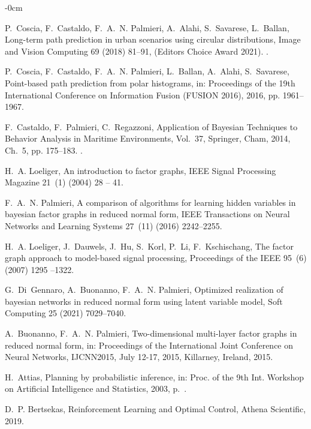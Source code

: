 \documentclass[journal,article,submit,pdftex,moreauthors]{Definitions/mdpi}
\begin{document}
\begin{adjustwidth}{-\extralength}{0cm}
\begin{thebibliography}{10}
	P.~Coscia, F.~Castaldo, F.~A.~N. Palmieri, A.~Alahi, S.~Savarese, L.~Ballan,
	  Long-term path prediction in urban scenarios using circular distributions,
	  Image and Vision Computing 69 (2018) 81--91, (Editors Choice Award 2021).
	\newblock \href {https://doi.org/doi.org/10.1016/j.imavis.2017.11.006}
	  {}.
	
	P.~Coscia, F.~Castaldo, F.~A.~N. Palmieri, L.~Ballan, A.~Alahi, S.~Savarese,
	  Point-based path prediction from polar histograms, in: Proceedings of the
	  19th International Conference on Information Fusion (FUSION 2016), 2016, pp.
	  1961--1967.
	
	F.~Castaldo, F.~Palmieri, C.~Regazzoni, Application of Bayesian Techniques to
	  Behavior Analysis in Maritime Environments, Vol.~37, Springer, Cham, 2014,
	  Ch.~5, pp. 175--183.
	\newblock \href {https://doi.org/doi.org/10.1007/978-3-319-18164-6\_17}
	  {}.
	
	H.~A. Loeliger, An introduction to factor graphs, IEEE Signal Processing
	  Magazine 21~(1) (2004) 28 -- 41.
	
	F.~A.~N. Palmieri, A comparison of algorithms for learning hidden variables in
	  bayesian factor graphs in reduced normal form, IEEE Transactions on Neural
	  Networks and Learning Systems 27~(11) (2016) 2242--2255.
	
	H.~A. Loeliger, J.~Dauwels, J.~Hu, S.~Korl, P.~Li, F.~Kschischang, The factor
	  graph approach to model-based signal processing, Proceedings of the IEEE
	  95~(6) (2007) 1295 --1322.
	
	G.~Di~Gennaro, A.~Buonanno, F.~A.~N. Palmieri, Optimized realization of
	  bayesian networks in reduced normal form using latent variable model, Soft
	  Computing 25 (2021) 7029–7040.
	
	A.~Buonanno, F.~A.~N. Palmieri, Two-dimensional multi-layer factor graphs in
	  reduced normal form, in: Proceedings of the International Joint Conference on
	  Neural Networks, IJCNN2015, July 12-17, 2015, Killarney, Ireland, 2015.
	
	H.~Attias, Planning by probabilistic inference, in: Proc. of the 9th Int.
	  Workshop on Artificial Intelligence and Statistics, 2003, p.~.
	
	D.~P. Bertsekas, Reinforcement Learning and Optimal Control, Athena Scientific,
	  2019.
	

\end{thebibliography}
\end{adjustwidth}
\end{document}
